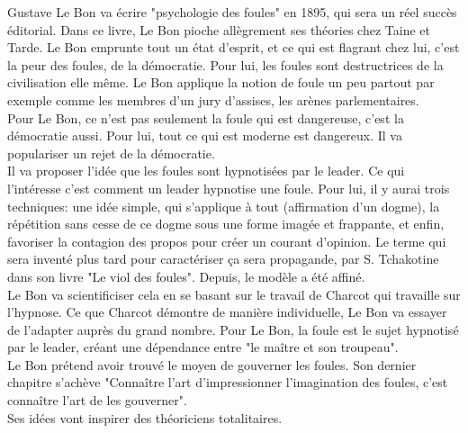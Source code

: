 \documentclass[10pt, a4paper, openany]{book}
\begin{document}
Gustave Le Bon va écrire "psychologie des foules" en 1895, qui sera un réel succès éditorial. Dans ce livre, Le Bon pioche allègrement ses théories chez Taine et Tarde. Le Bon emprunte tout un état d'esprit, et ce qui est flagrant chez lui, c'est la peur des foules, de la démocratie. Pour lui, les foules sont destructrices de la civilisation elle même. Le Bon applique la notion de foule un peu partout par exemple comme les membres d'un jury d'assises, les arènes parlementaires. \\
Pour Le Bon, ce n'est pas seulement la foule qui est dangereuse, c'est la démocratie aussi. Pour lui, tout ce qui est moderne est dangereux. Il va populariser un rejet de la démocratie. \\
Il va proposer l'idée que les foules sont hypnotisées par le leader. Ce qui l'intéresse c'est comment un leader hypnotise une foule. Pour lui, il y aurai trois techniques: une idée simple, qui s'applique à tout (affirmation d'un dogme), la répétition sans cesse de ce dogme sous une forme imagée et frappante, et enfin, favoriser la contagion des propos pour créer un courant d'opinion. Le terme qui sera inventé plus tard pour caractériser ça sera propagande, par S. Tchakotine dans son livre "Le viol des foules". Depuis, le modèle a été affiné. \\
Le Bon va scientificiser cela en se basant sur le travail de Charcot qui travaille sur l'hypnose. Ce que Charcot démontre de manière individuelle, Le Bon va essayer de l'adapter auprès du grand nombre. Pour Le Bon, la foule est le sujet hypnotisé par le leader, créant une dépendance entre "le maître et son troupeau". \\
Le Bon prétend avoir trouvé le moyen de gouverner les foules. Son dernier chapitre s'achève "Connaître l'art d'impressionner l'imagination des foules, c'est connaître l'art de les gouverner". \\
Ses idées vont inspirer des théoriciens totalitaires. 
\end{document}
